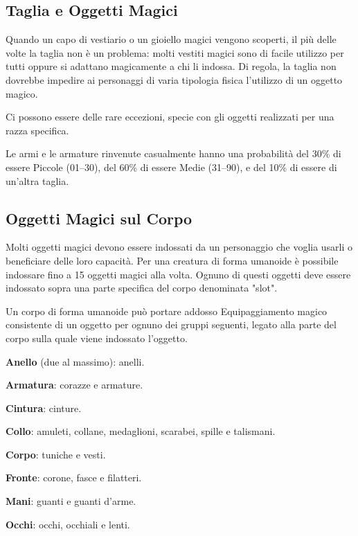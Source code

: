 \documentclass[a4paper,11pt,twoside,openany]{book}
\begin{document}
\subsection{Taglia e Oggetti Magici}

\label{taglia-e-oggetti-magici}

Quando un capo di vestiario o un gioiello magici vengono scoperti, il più delle volte la taglia non è un problema: molti vestiti magici sono di facile utilizzo per tutti oppure si adattano magicamente a chi li indossa. Di regola, la taglia non dovrebbe impedire ai personaggi di varia tipologia fisica l'utilizzo di un oggetto magico.

Ci possono essere delle rare eccezioni, specie con gli oggetti realizzati per una razza specifica.

Le armi e le armature rinvenute casualmente hanno una probabilità del 30\% di essere Piccole (01--30), del 60\% di essere Medie (31--90), e del 10\% di essere di un'altra taglia.

\subsection{Oggetti Magici sul Corpo}

\label{oggetti-magici-sul-corpo}

Molti oggetti magici devono essere indossati da un personaggio che voglia usarli o beneficiare delle loro capacità. Per una creatura di forma umanoide è possibile indossare fino a 15 oggetti magici alla volta. Ognuno di questi oggetti deve essere indossato sopra una parte specifica del corpo denominata "slot".

Un corpo di forma umanoide può portare addosso Equipaggiamento magico consistente di un oggetto per ognuno dei gruppi seguenti, legato alla parte del corpo sulla quale viene indossato l'oggetto.

\textbf{Anello} (due al massimo): anelli.

\textbf{Armatura}: corazze e armature.

\textbf{Cintura}: cinture.

\textbf{Collo}: amuleti, collane, medaglioni, scarabei, spille e talismani.

\textbf{Corpo}: tuniche e vesti.

\textbf{Fronte}: corone, fasce e filatteri.

\textbf{Mani}: guanti e guanti d'arme.

\textbf{Occhi}: occhi, occhiali e lenti.
\end{document}

